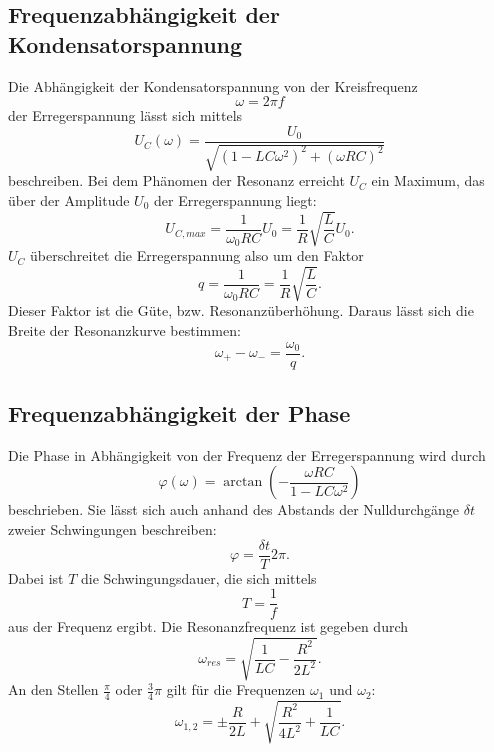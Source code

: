 \subsection{Frequenzabhängigkeit der Kondensatorspannung}
Die Abhängigkeit der Kondensatorspannung von der Kreisfrequenz
\begin{equation*}
    \omega = 2\pi f
\end{equation*}
der Erregerspannung lässt sich mittels 
\begin{equation}
    U_{C}(\omega)= \frac{U_{0}}{\sqrt{(1-LC\omega^{2})^{2} + (\omega R C)^{2}}}
\end{equation}
beschreiben.
Bei dem Phänomen der Resonanz erreicht $U_{C}$ ein Maximum, das über der Amplitude $U_{0}$ der Erregerspannung liegt:
\begin{equation}
    U_{C, max} = \frac{1}{\omega_{0}RC} U_{0} = \frac{1}{R} \sqrt{\frac{L}{C}} U_{0}.
\end{equation}
$U_{C}$ überschreitet die Erregerspannung also um den Faktor 
\begin{equation}
    q = \frac{1}{\omega_{0}RC} = \frac{1}{R} \sqrt{\frac{L}{C}}.
    \label{eqn:q}
\end{equation}
Dieser Faktor ist die Güte, bzw. Resonanzüberhöhung.
Daraus lässt sich die Breite der Resonanzkurve bestimmen:
\begin{equation}
    \omega_{+} - \omega_{-} = \frac{\omega_{0}}{q}.
    \label{eqn:breite}
\end{equation}

\subsection{Frequenzabhängigkeit der Phase}
Die Phase in Abhängigkeit von der Frequenz der Erregerspannung wird durch
\begin{equation*}
    \varphi(\omega) = \arctan(-\frac{\omega RC}{1-LC\omega^2})
\end{equation*}
beschrieben.
Sie lässt sich auch anhand des Abstands der Nulldurchgänge $\delta t$ zweier Schwingungen beschreiben:
\begin{equation}
    \varphi = \frac{\delta t}{T} 2 \pi.
    \label{eqn:phi}
\end{equation}
Dabei ist $T$ die Schwingungsdauer, die sich mittels
\begin{equation*}
    T = \frac{1}{f}
\end{equation*}
aus der Frequenz ergibt.
Die Resonanzfrequenz ist gegeben durch
\begin{equation}
    \omega_{res} = \sqrt{\frac{1}{LC} - \frac{R^2}{2L^2}}.
    \label{eqn:omega_res}
\end{equation}
An den Stellen $\frac{\pi}{4}$ oder $\frac{3}{4} \pi$ gilt für die Frequenzen $\omega_{1}$
und $\omega_{2}$:
\begin{equation}
    \omega_{1,2} = \pm \frac{R}{2L} + \sqrt{\frac{R^2}{4L^2} + \frac{1}{LC}}.
    \label{eqn:omega_12}
\end{equation}